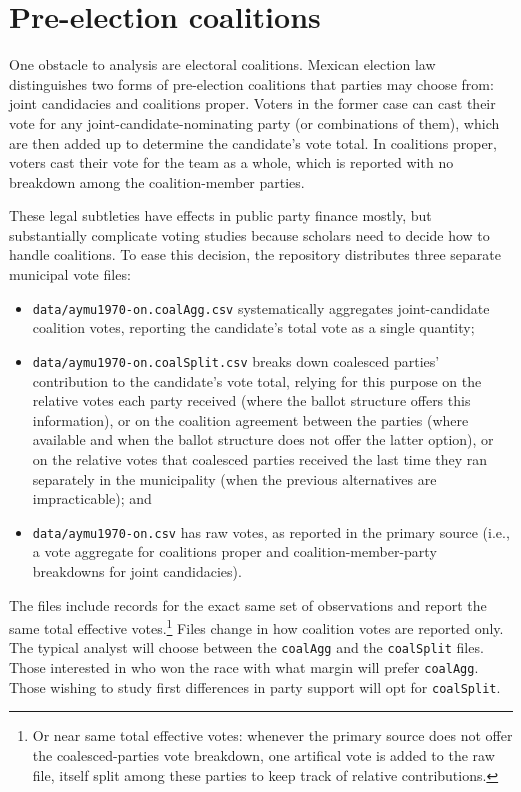 \documentclass[letter,12pt]{article}
\begin{document}
\section{Pre-election coalitions}

One obstacle to analysis are electoral coalitions. Mexican election law distinguishes two forms of pre-election coalitions that parties may choose from: joint candidacies and coalitions proper. Voters in the former case can cast their vote for any joint-candidate-nominating party (or combinations of them), which are then added up to determine the candidate's vote total. In coalitions proper, voters cast their vote for the team as a whole, which is reported with no breakdown among the coalition-member parties.

These legal subtleties have effects in public party finance mostly, but substantially complicate voting studies because scholars need to decide how to handle coalitions. To ease this decision, the repository distributes three separate municipal vote files: 

\begin{itemize}
\item \verb|data/aymu1970-on.coalAgg.csv| systematically aggregates joint-candidate coalition votes, reporting the candidate's total vote as a single quantity;
\item \verb|data/aymu1970-on.coalSplit.csv| breaks down coalesced parties' contribution to the candidate's vote total, relying for this purpose on the relative votes each party received (where the ballot structure offers this information), or on the coalition agreement between the parties (where available and when the ballot structure does not offer the latter option), or on the relative votes that coalesced parties received the last time they ran separately in the municipality (when the previous alternatives are impracticable); and
\item \verb|data/aymu1970-on.csv| has raw votes, as reported in the primary source (i.e., a vote aggregate for coalitions proper and coalition-member-party breakdowns for joint candidacies).
\end{itemize}

\noindent The files include records for the exact same set of observations and report the same total effective votes.\footnote{Or near same total effective votes: whenever the primary source does not offer the coalesced-parties vote breakdown, one artifical vote is added to the raw file, itself split among these parties to keep track of relative contributions.} Files change in how coalition votes are reported only. The typical analyst will choose between the \verb|coalAgg| and the \verb|coalSplit| files. Those interested in who won the race with what margin will prefer \verb|coalAgg|. Those wishing to study first differences in party support will opt for \verb|coalSplit|.
\end{document}
